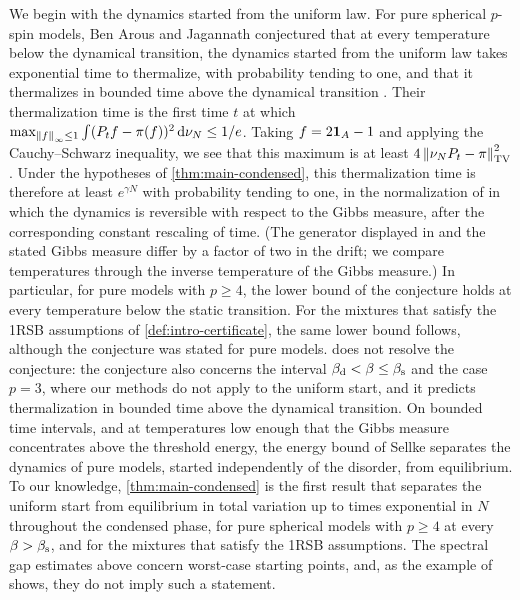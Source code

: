 We begin with the dynamics started from the uniform law. For pure spherical $p$-spin models, Ben Arous and Jagannath conjectured that at every temperature below the dynamical transition, the dynamics started from the uniform law takes exponential time to thermalize, with probability tending to one, and that it thermalizes in bounded time above the dynamical transition \cite[arXiv v1, Section~2.5, Conjecture~6]{BenArousJagannath2024}.
Their thermalization time is the first time $t$ at which $\max_{\left\lVert f\right\rVert_\infty\le1}\int(P_tf-\pi(f))^2\,\mathrm d\nu_N\le1/e$. Taking $f=2\mathbf 1_A-1$ and applying the Cauchy--Schwarz inequality, we see that this maximum is at least $4\left\lVert\nu_NP_t-\pi\right\rVert_{\mathrm{TV}}^2$. Under the hypotheses of \cref{thm:main-condensed}, this thermalization time is therefore at least $e^{\gamma N}$ with probability tending to one, in the normalization of \cite{BenArousJagannath2024} in which the dynamics is reversible with respect to the Gibbs measure, after the corresponding constant rescaling of time. (The generator displayed in \cite[p.~2 of arXiv v1]{BenArousJagannath2024} and the stated Gibbs measure differ by a factor of two in the drift; we compare temperatures through the inverse temperature of the Gibbs measure.) In particular, for pure models with $p\ge4$, the lower bound of the conjecture holds at every temperature below the static transition. For the mixtures that satisfy the 1RSB assumptions of \cref{def:intro-certificate}, the same lower bound follows, although the conjecture was stated for pure models.  does not resolve the conjecture: the conjecture also concerns the interval $\beta_{\mathrm d}<\beta\le\beta_{\mathrm s}$ and the case $p=3$, where our methods do not apply to the uniform start, and it predicts thermalization in bounded time above the dynamical transition. On bounded time intervals, and at temperatures low enough that the Gibbs measure concentrates above the threshold energy, the energy bound of Sellke \cite[Theorem~1.7]{Sellke2024} separates the dynamics of pure models, started independently of the disorder, from equilibrium. To our knowledge, \cref{thm:main-condensed} is the first result that separates the uniform start from equilibrium in total variation up to times exponential in $N$ throughout the condensed phase, for pure spherical models with $p\ge4$ at every $\beta>\beta_{\mathrm s}$, and for the mixtures that satisfy the 1RSB assumptions. The spectral gap estimates above concern worst-case starting points, and, as the example of \cite{GheissariGrantYu2026} shows, they do not imply such a statement.

